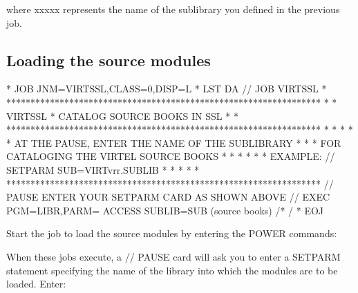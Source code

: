 \documentclass[letterpaper,10pt,english]{sphinxmanual}
\begin{document}
\begin{sphinxVerbatim}[commandchars=\\\{\}]
  
\end{sphinxVerbatim}

where xxxxx represents the name of the sublibrary you defined in the previous job.


\subsection{Loading the source modules}
\label{\detokenize{Installation_Guide:loading-the-source-modules}}
\begin{sphinxVerbatim}[commandchars=\\\{\}]
* \PYGZdl{}\PYGZdl{} JOB JNM=VIRTSSL,CLASS=0,DISP=L
* \PYGZdl{}\PYGZdl{} LST DA
// JOB VIRTSSL
* *****************************************************************
* * VIRTSSL * CATALOG SOURCE BOOKS IN SSL                         *
* *****************************************************************
* *                                                               *
* * AT THE PAUSE, ENTER THE NAME OF THE SUB\PYGZhy{}LIBRARY               *
* * FOR CATALOGING THE VIRTEL SOURCE BOOKS                        *
* *                                                               *
* * EXAMPLE: // SETPARM SUB=\PYGZsq{}VIRTvrr.SUBLIB\PYGZsq{}                      *
* *                                                               *
* *****************************************************************
// PAUSE ENTER YOUR SETPARM CARD AS SHOWN ABOVE
// EXEC PGM=LIBR,PARM=\PYGZsq{} ACCESS SUBLIB=\PYGZam{}SUB\PYGZsq{}
        (source books)
/*
/\PYGZam{}
* \PYGZdl{}\PYGZdl{} EOJ
\end{sphinxVerbatim}


Start the job to load the source modules by entering the POWER commands:

\begin{sphinxVerbatim}[commandchars=\\\{\}]
 
 
 
 
\end{sphinxVerbatim}

When these jobs execute, a // PAUSE card will ask you to enter a SETPARM statement specifying the name of the library into which the modules are to be loaded. Enter:
\end{document}
